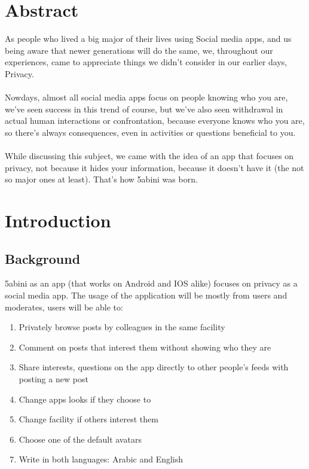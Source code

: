 \documentclass[12pt]{article}
\begin{document}
\section*{Abstract}
As people who lived a big major of their lives using Social media apps, and us being aware that newer generations will do the same, we, throughout our experiences, came to appreciate things we didn't consider in our earlier days, Privacy. \\ \\
Nowdays, almost all social media apps focus on people knowing who you are, we've seen success in this  trend of course, but we've also seen withdrawal in actual human interactions or confrontation, because everyone knows who you are, so there's always consequences, even in activities or questions beneficial to you.\\  \\
 While discussing this subject, we came with the idea of an app that focuses on privacy, not because it hides your information, because it doesn't have it (the not so major ones at least). That's how 5abini was born.\sectionbreak
\sectionbreak
\sectionbreak\sectionbreak\sectionbreak\sectionbreak
\tableofcontents
\listoffigures
\sectionbreak



\section{Introduction}
\subsection{Background}
5abini as an app (that works on Android and IOS alike) focuses on privacy as a social media app. The usage of the application will be mostly from users and moderates, users will be able to:
\begin{enumerate}

\itemsep0em 
\item Privately browse posts by colleagues in the same facility
\item Comment on posts that interest them without showing who they are
\item Share interests, questions on the app directly to other people's feeds with posting a new post
\item Change apps looks if they choose to
\item Change facility if others interest them
\item Choose one of the default avatars
\item Write in both languages: Arabic and English
\end{enumerate}
\end{document}
